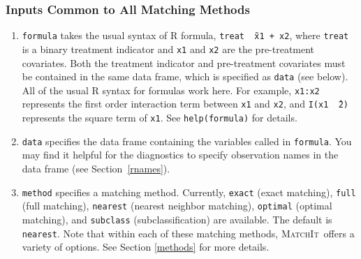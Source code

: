\documentclass[oneside,letterpaper,titlepage]{article}
\newcommand{\MatchIt}{\textsc{MatchIt}}
\begin{document}
\subsubsection{Inputs Common to All Matching Methods}

\begin{enumerate}
  
\item \texttt{formula} takes the usual syntax of R formula, {\tt treat
    \~\ x1 + x2}, where {\tt treat} is a binary treatment indicator
  and {\tt x1} and {\tt x2} are the pre-treatment covariates. Both the
  treatment indicator and pre-treatment covariates must be contained
  in the same data frame, which is specified as {\tt data} (see
  below).  All of the usual R syntax for formulas work here. For
  example, {\tt x1:x2} represents the first order interaction term
  between {\tt x1} and {\tt x2}, and {\tt I(x1 \^\ 2)} represents the
  square term of {\tt x1}. See {\tt help(formula)} for details.
  
\item \texttt{data} specifies the data frame containing the variables
  called in {\tt formula}.  You may find it helpful for the
  diagnostics to specify observation names in the data frame (see
  Section~\ref{rnames}).
  
\item \texttt{method} specifies a matching method. Currently,
  \texttt{exact} (exact matching), \texttt{full} (full matching),
  \texttt{nearest} (nearest neighbor matching), \texttt{optimal}
  (optimal matching), and \texttt{subclass} (subclassification) are
  available. The default is \texttt{nearest}. Note that within each of
  these matching methods, \MatchIt\ offers a variety of options.  See
  Section \ref{methods} for more details.
  

\end{enumerate}
\end{document}
